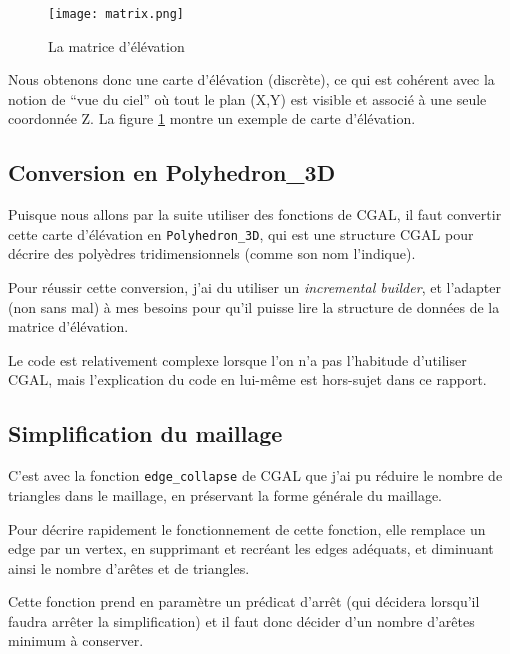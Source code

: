 \begin{figure}[H]
  \centering
   \texttt{[image: matrix.png]}
   \caption{La matrice d'élévation}
   \label{matrix}
\end{figure}

Nous obtenons donc une carte d'élévation (discrète), ce qui est cohérent avec la notion de ``vue du ciel'' où tout le plan (X,Y) est visible et associé à une seule coordonnée Z. La figure \ref{matrix} montre un exemple de carte d'élévation.
\subsection{Conversion en Polyhedron\_3D}
Puisque nous allons par la suite utiliser des fonctions de CGAL, il faut convertir cette carte d'élévation en \texttt{Polyhedron\_3D}, qui est une structure CGAL pour décrire des polyèdres tridimensionnels (comme son nom l'indique).

Pour réussir cette conversion, j'ai du utiliser un \emph{incremental builder}, et l'adapter (non sans mal) à mes besoins pour qu'il puisse lire la structure de données de la matrice d'élévation.

Le code est relativement complexe lorsque l'on n'a pas l'habitude d'utiliser CGAL, mais l'explication du code en lui-même est hors-sujet dans ce rapport.

\subsection{Simplification du maillage}
C'est avec la fonction \texttt{edge\_collapse} de CGAL que j'ai pu réduire le nombre de triangles dans le maillage, en préservant la forme générale du maillage.

Pour décrire rapidement le fonctionnement de cette fonction, elle remplace un edge par un vertex, en supprimant et recréant les edges adéquats, et diminuant ainsi le nombre d'arêtes et de triangles.

Cette fonction prend en paramètre un prédicat d'arrêt (qui décidera lorsqu'il faudra arrêter la simplification) et il faut donc décider d'un nombre d'arêtes minimum à conserver.